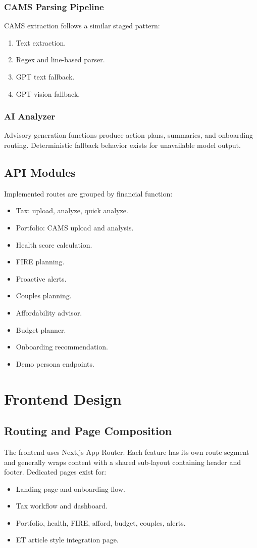 \documentclass[12pt,a4paper]{article}
\begin{document}
\subsubsection{CAMS Parsing Pipeline}
CAMS extraction follows a similar staged pattern:
\begin{enumerate}
	\item Text extraction.
	\item Regex and line-based parser.
	\item GPT text fallback.
	\item GPT vision fallback.
\end{enumerate}

\subsubsection{AI Analyzer}
Advisory generation functions produce action plans, summaries, and onboarding routing. Deterministic fallback behavior exists for unavailable model output.

\subsection{API Modules}
Implemented routes are grouped by financial function:
\begin{itemize}
	\item Tax: upload, analyze, quick analyze.
	\item Portfolio: CAMS upload and analysis.
	\item Health score calculation.
	\item FIRE planning.
	\item Proactive alerts.
	\item Couples planning.
	\item Affordability advisor.
	\item Budget planner.
	\item Onboarding recommendation.
	\item Demo persona endpoints.
\end{itemize}

\section{Frontend Design}
\subsection{Routing and Page Composition}
The frontend uses Next.js App Router. Each feature has its own route segment and generally wraps content with a shared sub-layout containing header and footer. Dedicated pages exist for:
\begin{itemize}
	\item Landing page and onboarding flow.
	\item Tax workflow and dashboard.
	\item Portfolio, health, FIRE, afford, budget, couples, alerts.
	\item ET article style integration page.
\end{itemize}
\end{document}
